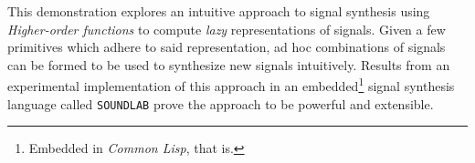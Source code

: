 This demonstration explores an intuitive approach to signal synthesis
using \textit{Higher-order functions} to compute \textit{lazy}
representations of signals. Given a few primitives which adhere to said
representation, ad hoc combinations of signals can be formed to be used
to synthesize new signals intuitively. Results from an experimental
implementation of this approach in an embedded\footnote{Embedded in
\textit{Common Lisp}, that is.} signal synthesis language called
\texttt{SOUNDLAB} prove the approach to be powerful and extensible.
